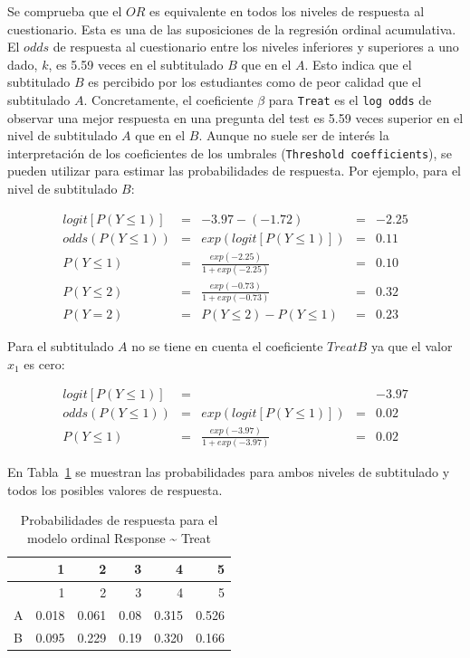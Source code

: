 \documentclass[
  12pt,
  a4paper,
  extrafontsizes,
  onecolumn,
  openright]{memoir}
\begin{document}
Se comprueba que el \(OR\) es equivalente en todos los niveles de
respuesta al cuestionario. Esta es una de las suposiciones de la
regresión ordinal acumulativa. El \(odds\) de respuesta al cuestionario
entre los niveles inferiores y superiores a uno dado, \(k\), es 5.59
veces en el subtitulado \(B\) que en el \(A\). Esto indica que el
subtitulado \(B\) es percibido por los estudiantes como de peor calidad
que el subtitulado \(A\). Concretamente, el coeficiente \(\beta\) para
\texttt{Treat} es el \texttt{log\ odds} de observar una mejor respuesta
en una pregunta del test es 5.59 veces superior en el nivel de
subtitulado \(A\) que en el \(B\). Aunque no suele ser de interés la
interpretación de los coeficientes de los umbrales
(\texttt{Threshold\ coefficients}), se pueden utilizar para estimar las
probabilidades de respuesta. Por ejemplo, para el nivel de subtitulado
\(B\):

\[
\begin{aligned}
logit [P(Y \le 1)] & = & -3.97 - (-1.72) & = & -2.25 \\
odds (P(Y \le 1)) & = & exp(logit [P(Y \le 1)]) & = & 0.11 \\
P(Y \le 1) & = & \frac{exp(-2.25)}{1 + exp(-2.25)} & = & 0.10 \\
P(Y \le 2) & = & \frac{exp(-0.73)}{1 + exp(-0.73)} & = & 0.32 \\
P(Y = 2) & = & P(Y \le 2) - P(Y \le 1) & = &  0.23 
\end{aligned}
\]

Para el subtitulado \(A\) no se tiene en cuenta el coeficiente
\(TreatB\) ya que el valor \(x_1\) es cero:

\[
\begin{aligned}
logit [P(Y \le 1)] & = & & & -3.97\\
odds (P(Y \le 1)) & = & exp(logit [P(Y \le 1)]) & = & 0.02 \\
P(Y \le 1) & = & \frac{exp(-3.97)}{1 + exp(-3.97)} & = & 0.02
\end{aligned}
\]

En Tabla~\ref{tbl-probs-clm-treat} se muestran las probabilidades para
ambos niveles de subtitulado y todos los posibles valores de respuesta.

\hypertarget{tbl-probs-clm-treat}{}
\begin{longtable}[]{@{}lrrrrr@{}}
\caption{\label{tbl-probs-clm-treat}Probabilidades de respuesta para el
modelo ordinal Response \textasciitilde{} Treat}\tabularnewline
\toprule\noalign{}
& 1 & 2 & 3 & 4 & 5 \\
\midrule\noalign{}
\endfirsthead
\toprule\noalign{}
& 1 & 2 & 3 & 4 & 5 \\
\midrule\noalign{}
\endhead
\bottomrule\noalign{}
\endlastfoot
A & 0.018 & 0.061 & 0.08 & 0.315 & 0.526 \\
B & 0.095 & 0.229 & 0.19 & 0.320 & 0.166 \\
\end{longtable}
\end{document}
